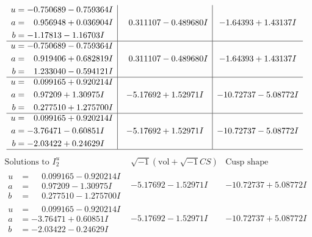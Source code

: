 \documentclass[1p]{elsarticle_modified}
\theoremstyle{definition}
\newcommand{\I}{\sqrt{-1}}
\begin{document}
$$\begin{array}{c|c|c}
\begin{aligned}
u &= -0.750689 - 0.759364 I \\
a &= \phantom{-}0.956948 + 0.036904 I \\
b &= -1.17813 - 1.16703 I\end{aligned}
 & \phantom{-}0.311107 - 0.489680 I & -1.64393 + 1.43137 I \\ \hline\begin{aligned}
u &= -0.750689 - 0.759364 I \\
a &= \phantom{-}0.919406 + 0.682819 I \\
b &= \phantom{-}1.233040 - 0.594121 I\end{aligned}
 & \phantom{-}0.311107 - 0.489680 I & -1.64393 + 1.43137 I \\ \hline\begin{aligned}
u &= \phantom{-}0.099165 + 0.920214 I \\
a &= \phantom{-}0.97209 + 1.30975 I \\
b &= \phantom{-}0.277510 + 1.275700 I\end{aligned}
 & -5.17692 + 1.52971 I & -10.72737 - 5.08772 I \\ \hline\begin{aligned}
u &= \phantom{-}0.099165 + 0.920214 I \\
a &= -3.76471 - 0.60851 I \\
b &= -2.03422 + 0.24629 I\end{aligned}
 & -5.17692 + 1.52971 I & -10.72737 - 5.08772 I\\
 \hline 
 \end{array}$$\newpage$$\begin{array}{c|c|c}  
\text{Solutions to }I^u_{2}& \I (\text{vol} + \sqrt{-1}CS) & \text{Cusp shape}\\
 \hline 
\begin{aligned}
u &= \phantom{-}0.099165 - 0.920214 I \\
a &= \phantom{-}0.97209 - 1.30975 I \\
b &= \phantom{-}0.277510 - 1.275700 I\end{aligned}
 & -5.17692 - 1.52971 I & -10.72737 + 5.08772 I \\ \hline\begin{aligned}
u &= \phantom{-}0.099165 - 0.920214 I \\
a &= -3.76471 + 0.60851 I \\
b &= -2.03422 - 0.24629 I\end{aligned}
 & -5.17692 - 1.52971 I & -10.72737 + 5.08772 I \\ \hline\begin{aligned}

\end{aligned}
\end{array}$$
\end{document}
